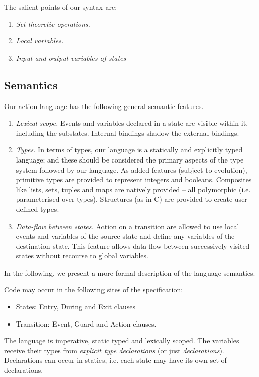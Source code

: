 \documentclass[12pt,a4paper]{article}
\begin{document}
The salient points of our syntax are:
\begin{enumerate}
	\item \emph{Set theoretic operations.}
	\item \emph{Local variables.}
	\item \emph{Input and output variables of states}
\end{enumerate}


\subsection{Semantics}
Our action language has the following general semantic features.
\begin{enumerate}
	\item \emph{Lexical scope.} Events and variables declared in a state are visible within it, including the substates. Internal bindings shadow the external bindings.
	\item \emph{Types.} In terms of types, our language is a statically and explicitly typed language; and these should be considered the primary aspects of the type system followed by our language. As added features (subject to evolution), primitive types are provided to represent integers and booleans. Composites like lists, sets, tuples and maps are natively provided -- all polymorphic (i.e. parameterised over types). Structures (as in C) are provided to create user defined types.  
	\item \emph{Data-flow between states.} Action on a transition are allowed to use local events and variables of the source state and define any variables of the destination state. This feature allows data-flow between successively visited states without recourse to global variables.
\end{enumerate}

In the following, we present a more formal description of the language semantics.

Code may occur in the following sites of the specification:
\begin{itemize}
	\item States: Entry, During and Exit clauses
	\item Transition: Event, Guard and Action clauses.
\end{itemize}

The language is imperative, static typed and lexically scoped. The variables receive their types from \emph{explicit type declarations} (or just \emph{declarations}). Declarations can occur in staties, i.e. each state may have its own set of declarations.
\end{document}
